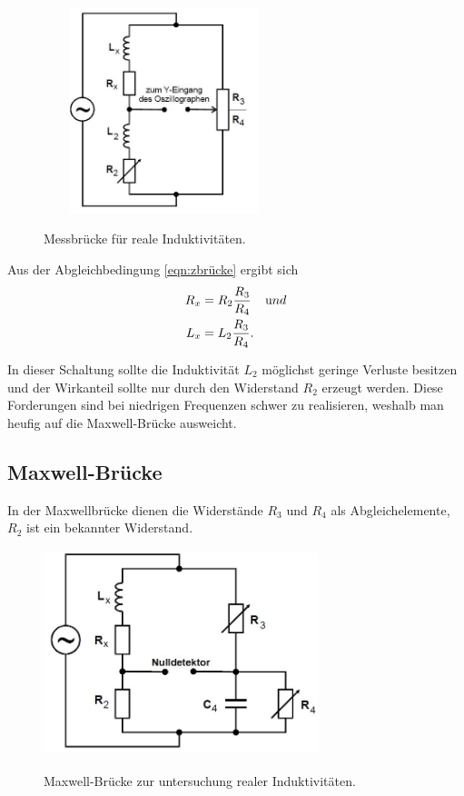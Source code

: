 \begin{figure}[H]
  \centering
  \includegraphics[width=7cm,height=6cm]{induktivitat.JPG}
  \caption{Messbrücke für reale Induktivitäten.}
  \label{fig:induktivitat}
  \cite{skript}
\end{figure}
Aus der Abgleichbedingung \ref{eqn:zbrücke} ergibt sich
\begin{align}
  R_{x} &=R_{2}\frac{R_{3}}{R_{4}} \;\;\;\; \text und \\
  L_{x} &=L_{2}\frac{R_{3}}{R_{4}}.
\end{align}

\noindent In dieser Schaltung sollte die Induktivität $L_{2}$ möglichst geringe
Verluste besitzen und der Wirkanteil sollte nur durch den Widerstand $R_{2}$ erzeugt werden.
Diese Forderungen sind bei niedrigen Frequenzen schwer zu realisieren, weshalb
man heufig auf die Maxwell-Brücke ausweicht.

\subsection{Maxwell-Brücke}
In der Maxwellbrücke dienen die Widerstände $R_{3}$ und $R_{4}$ als Abgleichelemente,
$R_{2}$ ist ein bekannter Widerstand.

\begin{figure}[H]
  \centering
  \includegraphics[width=8cm,height=6cm]{maxwell.JPG}
  \caption{Maxwell-Brücke zur untersuchung realer Induktivitäten.}
  \label{fig:maxwell}
  \cite{skript}
\end{figure}

